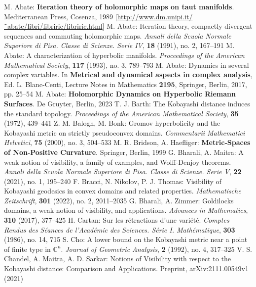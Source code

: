 \begin{thebibliography}{widest entry}
   M. Abate: \textbf{Iteration theory of holomorphic maps on taut manifolds}. Mediterranean Press, Cosenza, 1989 [\url{http://www.dm.unipi.it/˜abate/libri/libriric/libriric.html}]
   M. Abate: Iteration theory, compactly divergent sequences and commuting holomorphic maps. \textit{Annali della Scuola Normale Superiore di Pisa. Classe di Scienze. Serie IV}, \textbf{18} (1991), no. 2, 167--191
   M. Abate: A characterization of hyperbolic manifolds. \textit{Proceedings of the American Mathematical Society}, \textbf{117} (1993), no. 3, 789--793
   M. Abate: Dynamics in several complex variables. In \textbf{Metrical and dynamical aspects in complex analysis}, Ed. L. Blanc-Centi, Lecture Notes in Mathematics \textbf{2195}, Springer, Berlin, 2017, pp. 25--54
   M. Abate: \textbf{Holomorphic Dynamics on Hyperbolic Riemann Surfaces}. De Gruyter, Berlin, 2023
   T. J. Barth: The Kobayashi distance induces the standard topology. \textit{Proceedings of the American Mathematical Society}, \textbf{35} (1972), 439--441
   Z. M. Balogh, M. Bonk: Gromov hyperbolicity and the Kobayashi metric on strictly pseudoconvex domains. \textit{Commentarii Mathematici Helvetici}, \textbf{75} (2000), no. 3, 504--533
   M. R. Bridson, A. Haefliger: \textbf{Metric-Spaces of Non-Positive Curvature}. Springer, Berlin, 1999
   G. Bharali, A. Maitra: A weak notion of visibility, a family of examples, and Wolff-Denjoy theorems. \textit{Annali della Scuola Normale Superiore di Pisa. Classe di Scienze. Serie V}, \textbf{22} (2021), no. 1, 195--240
   F. Bracci, N. Nikolov, P. J. Thomas: Visibility of Kobayashi geodesics in convex domains and related properties. \textit{Mathematische Zeitschrift}, \textbf{301} (2022), no. 2, 2011--2035
   G. Bharali, A. Zimmer: Goldilocks domains, a weak notion of visibility, and applications. \textit{Advances in Mathematics}, \textbf{310} (2017), 377--425
   H. Cartan: Sur les rétractions d'une variété. \textit{Comptes Rendus des Séances de l'Académie des Sciences. Série I. Mathématique}, \textbf{303} (1986), no. 14, 715
   S. Cho: A lower bound on the Kobayashi metric near a point of finite type in $\mathbb{C}^n$. \textit{Journal of Geometric Analysis}, \textbf{2} (1992), no. 4, 317--325
   V. S. Chandel, A. Maitra, A. D. Sarkar: Notions of Visibility with respect to the Kobayashi distance: Comparison and Applications. Preprint, arXiv:2111.00549v1 (2021)

\end{thebibliography}
